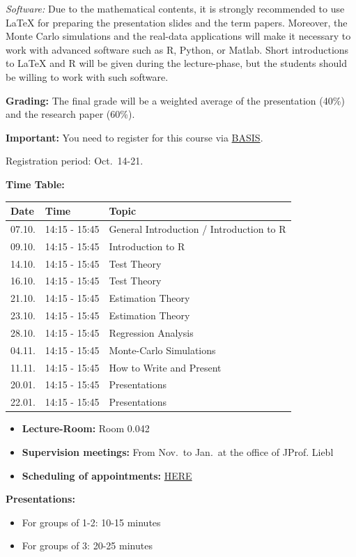 \documentclass[]{book}
\providecommand{\tightlist}{%
  \setlength{\itemsep}{0pt}\setlength{\parskip}{0pt}}
\theoremstyle{definition}
\theoremstyle{definition}
\theoremstyle{definition}
\theoremstyle{remark}
\begin{document}
\emph{Software:} Due to the mathematical contents, it is strongly recommended to use LaTeX for preparing the presentation slides and the term papers. Moreover, the Monte Carlo simulations and the real-data applications will make it necessary to work with advanced software such as R, Python, or Matlab. Short introductions to LaTeX and R will be given during the lecture-phase, but the students should be willing to work with such software.

\textbf{Grading:} The final grade will be a weighted average of the presentation (40\%) and the research paper (60\%).

\textbf{Important:} You need to register for this course via \href{https://basis.uni-bonn.de/}{BASIS}.

Registration period: Oct.~14-21.

\textbf{Time Table:}

\begin{longtable}[]{@{}lll@{}}
\toprule
Date & Time & Topic\tabularnewline
\midrule
\endhead
07.10. & 14:15 - 15:45 & General Introduction / Introduction to R\tabularnewline
09.10. & 14:15 - 15:45 & Introduction to R\tabularnewline
14.10. & 14:15 - 15:45 & Test Theory\tabularnewline
16.10. & 14:15 - 15:45 & Test Theory\tabularnewline
21.10. & 14:15 - 15:45 & Estimation Theory\tabularnewline
23.10. & 14:15 - 15:45 & Estimation Theory\tabularnewline
28.10. & 14:15 - 15:45 & Regression Analysis\tabularnewline
04.11. & 14:15 - 15:45 & Monte-Carlo Simulations\tabularnewline
11.11. & 14:15 - 15:45 & How to Write and Present\tabularnewline
20.01. & 14:15 - 15:45 & Presentations\tabularnewline
22.01. & 14:15 - 15:45 & Presentations\tabularnewline
\bottomrule
\end{longtable}

\begin{itemize}
\tightlist
\item
  \textbf{Lecture-Room:} Room 0.042
\item
  \textbf{Supervision meetings:} From Nov.~to Jan.~at the office of JProf. Liebl
\item
  \textbf{Scheduling of appointments:} \href{https://docs.google.com/spreadsheets/d/1clb0ple3GaRlwod5JOKK84A996p1BKNMSs32JrqBZ_A/edit?usp=sharing}{HERE}
\end{itemize}

\textbf{Presentations:}

\begin{itemize}
\tightlist
\item
  For groups of 1-2: 10-15 minutes
\item
  For groups of 3: 20-25 minutes
\end{itemize}
\end{document}
